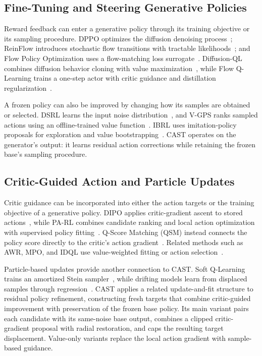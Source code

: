 \subsection{Fine-Tuning and Steering Generative Policies}

Reward feedback can enter a generative policy through its training objective
or its sampling procedure. DPPO optimizes the diffusion denoising
process~\cite{ren2024dppo,black2024training}; ReinFlow introduces stochastic flow transitions
with tractable likelihoods~\cite{reinflow2025}; and Flow Policy Optimization
uses a flow-matching loss surrogate~\cite{mcallister2025flowmatchingpolicygradients}.
Diffusion-QL combines diffusion behavior cloning with value
maximization~\cite{wang2023diffusionql}, while Flow Q-Learning trains a
one-step actor with critic guidance and distillation
regularization~\cite{park2025fql}.

A frozen policy can also be improved by changing how its samples are
obtained or selected. DSRL learns the input noise
distribution~\cite{wagenmaker2025dsrl}, and V-GPS ranks sampled actions
using an offline-trained value function~\cite{nakamoto2025vgps}. IBRL
uses imitation-policy proposals for exploration and value
bootstrapping~\cite{hu2024ibrl}. CAST operates on the generator's output:
it learns residual action corrections while retaining the frozen base's
sampling procedure.

\subsection{Critic-Guided Action and Particle Updates}

Critic guidance can be incorporated into either the action targets or the training objective of a generative policy. DIPO applies critic-gradient ascent to stored actions~\cite{dipo2024}, while PA-RL combines candidate ranking and local action optimization with supervised policy fitting~\cite{mark2024parl}. Q-Score Matching (QSM) instead connects the policy score directly to the critic's action gradient~\cite{psenka2024qsm}. Related methods such as AWR, MPO, and IDQL use value-weighted fitting or action selection~\cite{peng2019awr,abdolmaleki2018mpo,hansenestruch2023idql,nair2020awac}.

Particle-based updates provide another connection to CAST. Soft Q-Learning trains an amortized Stein sampler~\cite{haarnoja2017sql}, while drifting models learn from displaced samples through regression~\cite{deng2026drifting}. CAST applies a related update-and-fit structure to residual policy refinement, constructing fresh targets that combine critic-guided improvement with preservation of the frozen base policy. Its main variant pairs each candidate with its same-noise base output, combines a clipped critic-gradient proposal with radial restoration, and caps the resulting target displacement. Value-only variants replace the local action gradient with sample-based guidance.



